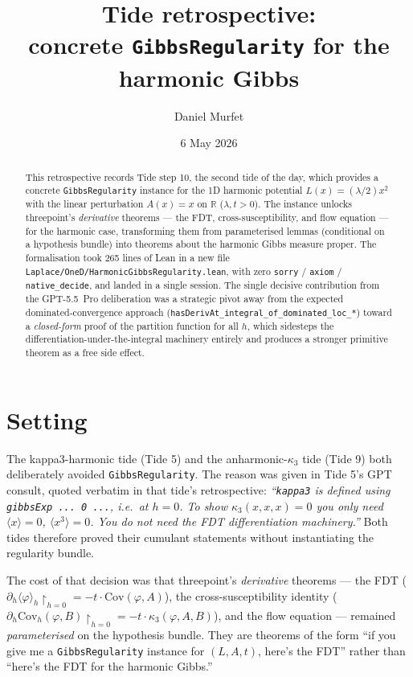 \documentclass[11pt]{article}
\title{Tide retrospective:\\concrete \texttt{GibbsRegularity} for the harmonic Gibbs}
\author{Daniel Murfet}
\date{6 May 2026}
\begin{document}
\maketitle

\begin{abstract}
This retrospective records Tide step 10, the second tide of the day,
which provides a concrete \texttt{GibbsRegularity} instance for the
1D harmonic potential $L(x) = (\lambda/2)x^2$ with the linear
perturbation $A(x) = x$ on $\mathbb{R}$ ($\lambda, t > 0$). The
instance unlocks threepoint's \emph{derivative} theorems --- the FDT,
cross-susceptibility, and flow equation --- for the harmonic case,
transforming them from parameterised lemmas (conditional on a
hypothesis bundle) into theorems about the harmonic Gibbs measure
proper. The formalisation took 265 lines of Lean in a new file
\texttt{Laplace/OneD/HarmonicGibbsRegularity.lean}, with zero
\texttt{sorry} / \texttt{axiom} / \texttt{native\_decide}, and landed
in a single session. The single decisive contribution from the
GPT-5.5~Pro deliberation was a strategic pivot away from the
expected dominated-convergence approach
(\texttt{hasDerivAt\_integral\_of\_dominated\_loc\_*}) toward a
\emph{closed-form} proof of the partition function for all $h$,
which sidesteps the differentiation-under-the-integral machinery
entirely and produces a stronger primitive theorem as a free side
effect.
\end{abstract}

\section{Setting}

The kappa3-harmonic tide (Tide 5) and the anharmonic-$\kappa_3$ tide
(Tide 9) both deliberately avoided \texttt{GibbsRegularity}. The
reason was given in Tide 5's GPT consult, quoted verbatim in that
tide's retrospective: \emph{``\texttt{kappa3} is defined using
\texttt{gibbsExp~...~0~...}, i.e.\ at $h = 0$. To show
$\kappa_3(x,x,x) = 0$ you only need $\langle x \rangle = 0$,
$\langle x^3 \rangle = 0$. You do not need the FDT differentiation
machinery.''} Both tides therefore proved their cumulant statements
without instantiating the regularity bundle.

The cost of that decision was that threepoint's \emph{derivative}
theorems --- the FDT
($\partial_h \langle \varphi \rangle_h\!\restriction_{h=0}
= -t \cdot \mathrm{Cov}(\varphi, A)$),
the cross-susceptibility identity
($\partial_h \mathrm{Cov}_h(\varphi, B)\!\restriction_{h=0}
= -t \cdot \kappa_3(\varphi, A, B)$),
and the flow equation --- remained \emph{parameterised} on the
hypothesis bundle. They are theorems of the form ``if you give me a
\texttt{GibbsRegularity} instance for $(L, A, t)$, here's the FDT''
rather than ``here's the FDT for the harmonic Gibbs.''
\end{document}
